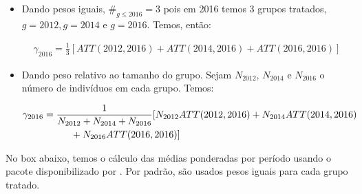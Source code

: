 \documentclass[portugues]{article}
\begin{document}
\begin{itemize}
    \item Dando pesos iguais, $\#_{ g \leq 2016} = 3$ pois em 2016 temos 3 grupos tratados, $g=2012, g=2014$ e $g=2016$. Temos, então:

    \[
    \begin{split}
         \gamma_{2016} = \frac{1}{3} [ATT(2012, 2016) + ATT(2014,2016) + ATT(2016,2016)] 
    \end{split}
    \]

    \item Dando peso relativo ao tamanho do grupo. Sejam $N_{2012}$, $N_{2014}$ e $N_{2016}$ o número de indivíduos em cada grupo. Temos:

    \[
    \begin{split}
        \gamma_{2016} &=  \frac{1}{N_{2012} + N_{2014} + N_{2016}} [N_{2012} ATT(2012, 2016) +  N_{2014} ATT(2014, 2016) \\
        & \hspace{10mm}+  N_{2016} ATT(2016, 2016)] 
    \end{split}
    \]
    
\end{itemize}

No box abaixo, temos o cálculo das médias ponderadas por período usando o pacote disponibilizado por \cite{callaway2021difference}. Por padrão, são usados pesos iguais para cada grupo tratado.
\end{document}
